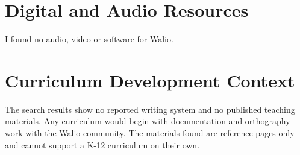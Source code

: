 \documentclass[12pt]{article}
\begin{document}
\section{Digital and Audio Resources}
I found no audio, video or software for Walio.

\section{Curriculum Development Context}
The search results show no reported writing system and no published teaching materials. Any curriculum would begin with documentation and orthography work with the Walio community. The materials found are reference pages only and cannot support a K-12 curriculum on their own.
\end{document}
